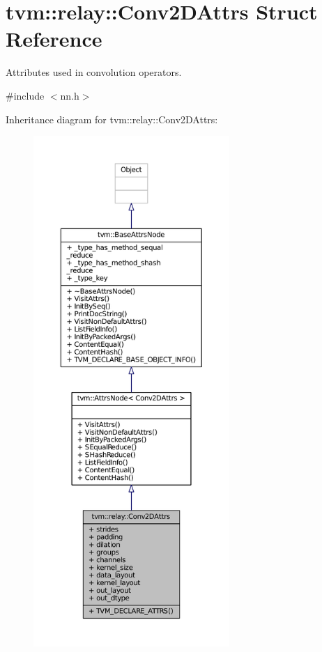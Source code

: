 \hypertarget{structtvm_1_1relay_1_1Conv2DAttrs}{}\section{tvm\+:\+:relay\+:\+:Conv2\+D\+Attrs Struct Reference}
\label{structtvm_1_1relay_1_1Conv2DAttrs}


Attributes used in convolution operators.  




{\ttfamily \#include $<$nn.\+h$>$}



Inheritance diagram for tvm\+:\+:relay\+:\+:Conv2\+D\+Attrs\+:
\nopagebreak
\begin{figure}[H]
\begin{center}
\leavevmode
\includegraphics[height=550pt]{structtvm_1_1relay_1_1Conv2DAttrs__inherit__graph}
\end{center}
\end{figure}



